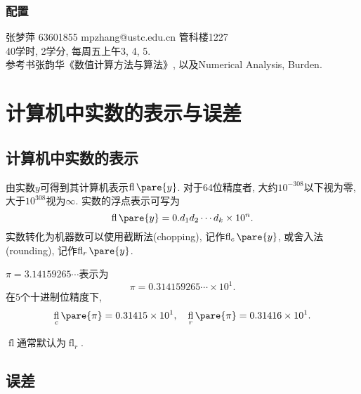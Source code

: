 \documentclass[hidelinks]{ctexart}
\DeclareMathOperator{\fl}{fl}
\begin{document}
\subsubsection*{配置} %
\label{ssub:配置}

\noindent
张梦萍 63601855 mpzhang@ustc.edu.cn 管科楼1227\\
40学时, 2学分, 每周五上午3, 4, 5.\\
参考书张韵华《数值计算方法与算法》, 以及Numerical Analysis, Burden.


\section{计算机中实数的表示与误差} %
\label{sec:计算机中实数的表示与误差}

\subsection{计算机中实数的表示} %
\label{sub:计算机中实数的表示}

\newpoint{}由实数$y$可得到其计算机表示$\fl\pare{y}$. 对于64位精度者, 大约$10^{-308}$以下视为零, 大于$10^{308}$视为$\infty$.
\newpoint{}实数的浮点表示可写为
\[ \fl\pare{y} = 0.d_1d_2\cdots d_k\times 10^{n}. \]
\newpoint{}实数转化为机器数可以使用截断法(chopping), 记作$\fl_c\pare{y}$, 或舍入法(rounding), 记作$\fl_r\pare{y}$.
\begin{ex}
    $\pi = 3.14159265\cdots$表示为
    \[ \pi = 0.314159265\cdots\times 10^1. \]
    在$5$个十进制位精度下,
    \[ \fl_c\pare{\pi} = 0.31415 \times 10^1,\quad \fl_r\pare{\pi} = 0.31416 \times 10^1. \]
\end{ex}
\begin{remark}
    $\fl$通常默认为$\fl_r$.
\end{remark}


\subsection{误差} %
\label{sub:误差}
\end{document}
